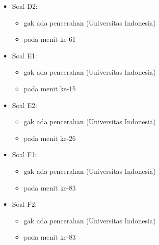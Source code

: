 \documentclass[a4paper]{article}
\begin{document}
\begin{itemize}
\begin{itemize}
\item Soal D2:
\begin{itemize}
\item gak ada pencerahan (Universitas Indonesia)
\item pada menit ke-61
\end{itemize}

\item Soal E1:
\begin{itemize}
\item gak ada pencerahan (Universitas Indonesia)
\item pada menit ke-15
\end{itemize}

\item Soal E2:
\begin{itemize}
\item gak ada pencerahan (Universitas Indonesia)
\item pada menit ke-26
\end{itemize}

\item Soal F1:
\begin{itemize}
\item gak ada pencerahan (Universitas Indonesia)
\item pada menit ke-83
\end{itemize}

\item Soal F2:
\begin{itemize}
\item gak ada pencerahan (Universitas Indonesia)
\item pada menit ke-83
\end{itemize}

\end{itemize}

\end{itemize}

\pagebreak


\pagebreak

\pagebreak

\pagebreak

\pagebreak

\pagebreak

\end{document}
